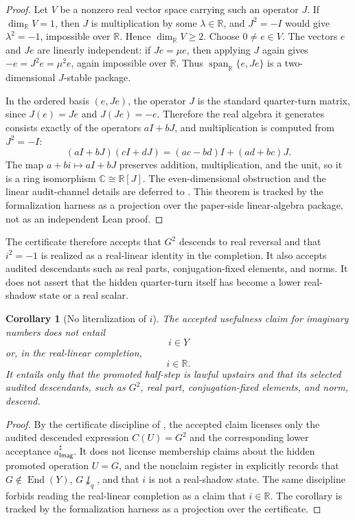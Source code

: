 \documentclass[11pt]{article}
\newcommand{\R}{\mathbb R}
\providecommand{\C}{}
\renewcommand{\C}{\mathbb C}
\newcommand{\Imag}{\mathsf{Imag}}
\newcommand{\End}{\operatorname{End}}
\newtheorem{corollary}[theorem]{Corollary}
\theoremstyle{definition}
\begin{document}
\begin{proof}
Let \(V\) be a nonzero real vector space carrying such an operator \(J\).  If
\(\dim_{\R}V=1\), then \(J\) is multiplication by some \(\lambda\in\R\), and
\(J^2=-I\) would give \(\lambda^2=-1\), impossible over \(\R\).  Hence
\(\dim_{\R}V\geq 2\).  Choose \(0\neq e\in V\).  The vectors \(e\) and \(Je\)
are linearly independent: if \(Je=\mu e\), then applying \(J\) again gives
\(-e=J^2e=\mu^2 e\), again impossible over \(\R\).  Thus
\(\operatorname{span}_{\R}\{e,Je\}\) is a two-dimensional \(J\)-stable package.

In the ordered basis \((e,Je)\), the operator \(J\) is the standard quarter-turn
matrix, since \(J(e)=Je\) and \(J(Je)=-e\).  Therefore the real algebra it
generates consists exactly of the operators \(aI+bJ\), and multiplication is
computed from \(J^2=-I\):
\[
(aI+bJ)(cI+dJ)=(ac-bd)I+(ad+bc)J.
\]
The map \(a+bi\mapsto aI+bJ\) preserves addition, multiplication, and the unit,
so it is a ring isomorphism \(\C\cong\R[J]\).  The even-dimensional obstruction
and the linear audit-channel details are deferred to .  This
theorem is tracked by the formalization harness as a projection over the
paper-side linear-algebra package, not as an independent Lean proof.
\end{proof}

The certificate therefore accepts that \(G^2\) descends to real reversal and
that \(i^2=-1\) is realized as a real-linear identity in the completion.  It
also accepts audited descendants such as real parts, conjugation-fixed
elements, and norms.  It does not assert that the hidden quarter-turn itself has
become a lower real-shadow state or a real scalar.

\begin{corollary}[No literalization of \texorpdfstring{$i$}{i}]
\label{cor:imag-no-literalization}
The accepted usefulness claim for imaginary numbers does not entail
\[
i\in Y
\]
or, in the real-linear completion,
\[
i\in\mathbb R.
\]
It entails only that the promoted half-step is lawful upstairs and that its selected audited descendants, such as \(G^2\), real part, conjugation-fixed elements, and norm, descend.
\end{corollary}

\begin{proof}
By the certificate discipline of , the accepted claim licenses
only the audited descended expression \(C(U)=G^2\) and the corresponding lower
acceptance \(a^\sharp_{\Imag}\).  It does not license membership claims about
the hidden promoted operation \(U=G\), and the nonclaim register in
 explicitly records that \(G\notin\End(Y)\),
\(G\not\downarrow_q\), and that \(i\) is not a real-shadow state.  The same
discipline forbids reading the real-linear completion as a claim that
\(i\in\R\).  The corollary is tracked by the formalization harness as a
projection over the certificate.
\end{proof}
\end{document}
